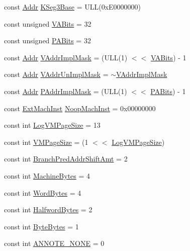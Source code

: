 \begin{DoxyCompactItemize}
const \hyperlink{classm5_1_1params_1_1Addr}{Addr} \hyperlink{namespaceMipsISA_a53c72053cff8d2410c867bd04c7e8838}{KSeg3Base} = ULL(0xE0000000)
\item 
const unsigned \hyperlink{namespaceMipsISA_a10ace529e46442ee4127c149da6513af}{VABits} = 32
\item 
const unsigned \hyperlink{namespaceMipsISA_a61386a9be90bc58024550fdbeb6ebaee}{PABits} = 32
\item 
const \hyperlink{classm5_1_1params_1_1Addr}{Addr} \hyperlink{namespaceMipsISA_a3d31b41fa4d20dbbd91b61d7df201ac9}{VAddrImplMask} = (ULL(1) $<$$<$ \hyperlink{namespaceMipsISA_a10ace529e46442ee4127c149da6513af}{VABits}) -\/ 1
\item 
const \hyperlink{classm5_1_1params_1_1Addr}{Addr} \hyperlink{namespaceMipsISA_abf1ec857b893186376e563b0da26ec1b}{VAddrUnImplMask} = $\sim$\hyperlink{namespaceMipsISA_a3d31b41fa4d20dbbd91b61d7df201ac9}{VAddrImplMask}
\item 
const \hyperlink{classm5_1_1params_1_1Addr}{Addr} \hyperlink{namespaceMipsISA_abb8b7685b079953e35015543262458e2}{PAddrImplMask} = (ULL(1) $<$$<$ \hyperlink{namespaceMipsISA_a61386a9be90bc58024550fdbeb6ebaee}{PABits}) -\/ 1
\item 
const \hyperlink{namespaceMipsISA_aec686c38e40c7f794f1435591c15c275}{ExtMachInst} \hyperlink{namespaceMipsISA_a8d1e39e0ea757dcc9725c6ccd81dd4c4}{NoopMachInst} = 0x00000000
\item 
const int \hyperlink{namespaceMipsISA_a554fef169d109a5ccb7ce0dd6a43e521}{LogVMPageSize} = 13
\item 
const int \hyperlink{namespaceMipsISA_a891eaf95159d764e6efae501c2860a3a}{VMPageSize} = (1 $<$$<$ \hyperlink{namespaceMipsISA_a554fef169d109a5ccb7ce0dd6a43e521}{LogVMPageSize})
\item 
const int \hyperlink{namespaceMipsISA_a518c446960e93d236b89246eabc20298}{BranchPredAddrShiftAmt} = 2
\item 
const int \hyperlink{namespaceMipsISA_a8f4ba87c53caab23396d3b86b672b0fb}{MachineBytes} = 4
\item 
const int \hyperlink{namespaceMipsISA_ad7cbfaab22a0fe402fee6c200d5334ad}{WordBytes} = 4
\item 
const int \hyperlink{namespaceMipsISA_af80fe89d59e1ea6cc089048f7e6ce436}{HalfwordBytes} = 2
\item 
const int \hyperlink{namespaceMipsISA_a41548456e714690f506fe7d7b12a6c46}{ByteBytes} = 1
\item 
const int \hyperlink{namespaceMipsISA_aba6031cb7b02bf6b349b736f4076d640}{ANNOTE\_\-NONE} = 0
$$
\end{DoxyCompactItemize}
